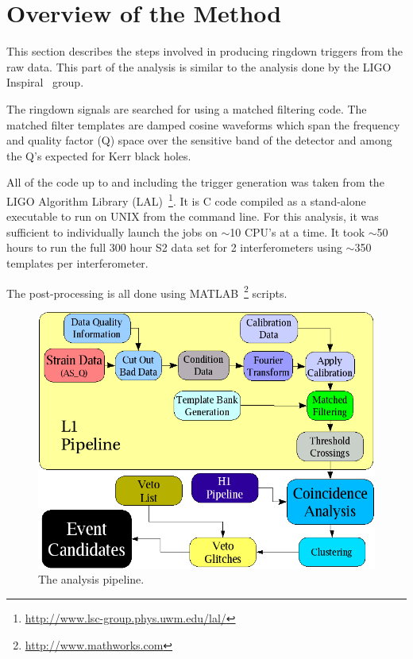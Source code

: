\section{Overview of the Method}

This section describes the steps involved in producing ringdown triggers from
the raw data. This part of the analysis
is similar to the analysis done by the LIGO 
Inspiral~\cite{S1:Inspiral} group.

The ringdown signals are searched for using a matched filtering code. The
matched filter templates are damped cosine waveforms which span the frequency
and quality factor (Q) space over the sensitive band of the detector and among
the Q's expected for Kerr black holes.

All of the code up to and including the trigger generation was taken from
the LIGO Algorithm Library (LAL)~\footnote{
\href{http://www.lsc-group.phys.uwm.edu/lal/}{http://www.lsc-group.phys.uwm.edu/lal/}}. 
It is C code compiled as a stand-alone executable to run on UNIX from the command line. 
For this analysis, it was sufficient to individually launch the jobs
on $\sim$10 CPU's at a time. It took $\sim$50 hours to run
the full 300 hour S2 data set for 2 interferometers using $\sim$350
templates per interferometer.

The post-processing is all done using 
MATLAB~\footnote{
\href{http://www.mathworks.com}{http://www.mathworks.com}} scripts.


\begin{figure}[!h]
\centerline{\includegraphics[angle=0,width=6.5in]{Figures/Chap7/Pipeline.png}}
\caption[Ringdown Pipeline]{The analysis pipeline.}
\label{fig:pipeline}
\end{figure}

